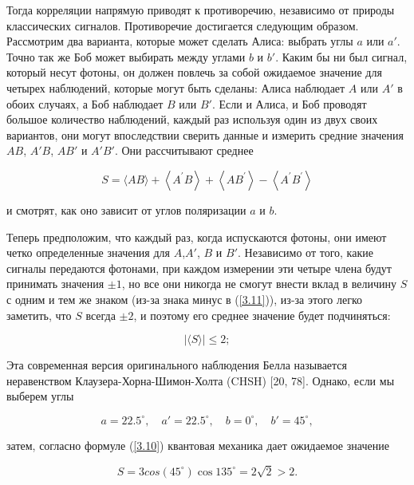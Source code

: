 \documentclass[main.tex]{subfiles}
\begin{document}
Тогда корреляции напрямую приводят к противоречию, независимо от природы классических сигналов. Противоречие достигается следующим образом. Рассмотрим два варианта, которые может сделать Алиса: выбрать углы $a$ или $a '$. Точно так же Боб может выбирать между углами $b$ и $b'$. Каким бы ни был сигнал, который несут фотоны, он должен повлечь за собой ожидаемое значение для четырех наблюдений, которые могут быть сделаны: Алиса наблюдает $A$ или $A'$ в обоих случаях, а Боб наблюдает $B$ или $B'$. Если и Алиса, и Боб проводят большое количество наблюдений, каждый раз используя один из двух своих вариантов, они могут впоследствии сверить данные и измерить средние значения $AB$, $A'B$, $AB'$ и $A'B'$. Они рассчитывают среднее

\begin{equation}\label{3.11}
	S=\langle A B\rangle+\left\langle A^{\prime} B\right\rangle+\left\langle A B^{\prime}\right\rangle-\left\langle A^{\prime} B^{\prime}\right\rangle
\end{equation}

и смотрят, как оно зависит от углов поляризации $a$ и $b$.

Теперь предположим, что каждый раз, когда испускаются фотоны, они имеют четко определенные значения для $A$,$ A '$, $B$ и $B'$. Независимо от того, какие сигналы передаются фотонами, при каждом измерении эти четыре члена будут принимать значения $\pm 1$, но все они никогда не смогут внести вклад в величину $S$ с одним и тем же знаком (из-за знака минус в (\ref{3.11})), из-за этого легко заметить, что $S$ всегда $\pm 2$, и поэтому его среднее значение будет подчиняться:

\begin{equation}\label{3.12}
	|\langle S \rangle| \leq 2;
\end{equation}
            
Эта современная версия оригинального наблюдения Белла называется неравенством Клаузера-Хорна-Шимон-Холта (CHSH) [20, 78]. Однако, если мы выберем углы

\begin{equation}\label{3.13}
	a = 22.5^\circ,\quad a'= 22.5^\circ,\quad b = 0 ^\circ,\quad b' = 45^\circ, 
\end{equation}
                                                     
затем, согласно формуле (\ref{3.10}) квантовая механика дает ожидаемое значение

\begin{equation}\label{3.14}
	S = 3cos (45^\circ) \cos 135^\circ = 2 \sqrt 2> 2.
\end{equation}
\end{document}
